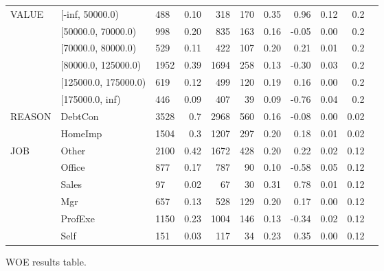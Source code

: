 \begin{landscape}
\begin{figure}[!ht]
\begin{tabular}{lllrrrrrrrr}
			\midrule
			    VALUE &       [-inf, 50000.0) &    488 &         0.10 &   318 &  170 &     0.35 &  0.96 &    0.12 &       0.2 \\
			    &    [50000.0, 70000.0) &    998 &         0.20 &   835 &  163 &     0.16 & -0.05 &    0.00 &       0.2 \\
			    &    [70000.0, 80000.0) &    529 &         0.11 &   422 &  107 &     0.20 &  0.21 &    0.01 &       0.2 \\
			    &   [80000.0, 125000.0) &   1952 &         0.39 &  1694 &  258 &     0.13 & -0.30 &    0.03 &       0.2 \\
			    &  [125000.0, 175000.0) &    619 &         0.12 &   499 &  120 &     0.19 &  0.16 &    0.00 &       0.2 \\
			    &       [175000.0, inf) &    446 &         0.09 &   407 &   39 &     0.09 & -0.76 &    0.04 &       0.2 \\
			\midrule
			    REASON &  DebtCon &   3528 &          0.7 &  2968 &  560 &     0.16 & -0.08 &    0.00 &      0.02 \\
 				  &  HomeImp &   1504 &          0.3 &  1207 &  297 &     0.20 &  0.18 &    0.01 &      0.02 \\
			\midrule
			       JOB &    Other &   2100 &         0.42 &  1672 &  428 &     0.20 &  0.22 &    0.02 &      0.12 \\
			      &   Office &    877 &         0.17 &   787 &   90 &     0.10 & -0.58 &    0.05 &      0.12 \\
			      &    Sales &     97 &         0.02 &    67 &   30 &     0.31 &  0.78 &    0.01 &      0.12 \\
			      &      Mgr &    657 &         0.13 &   528 &  129 &     0.20 &  0.17 &    0.00 &      0.12 \\
			      &  ProfExe &   1150 &         0.23 &  1004 &  146 &     0.13 & -0.34 &    0.02 &      0.12 \\
			      &     Self &    151 &         0.03 &   117 &   34 &     0.23 &  0.35 &    0.00 &      0.12 \\
			
			\bottomrule
		\end{tabular}
		\caption{WOE results table. \label{woe_1}}
	\end{figure}
	

\end{landscape}

